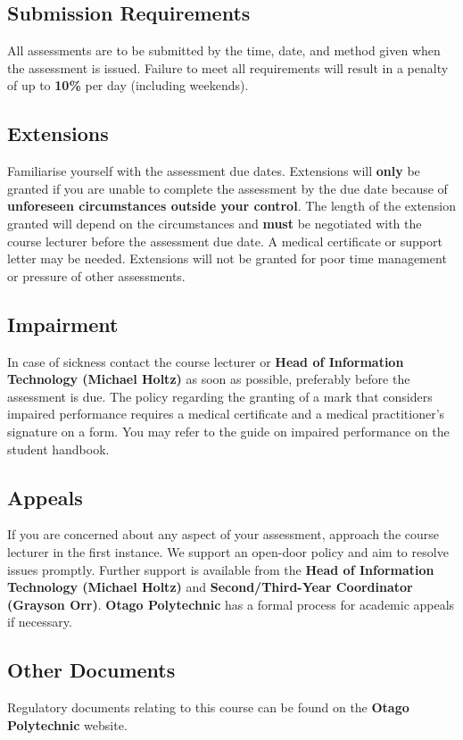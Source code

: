 \documentclass{article}
\begin{document}
\subsection*{Submission Requirements}
All assessments are to be submitted by the time, date, and method given when the assessment is issued. Failure to meet all requirements will result in a penalty of up to \textbf{10\%} per day (including weekends).

\subsection*{Extensions}
Familiarise yourself with the assessment due dates. Extensions will \textbf{only} be granted if you are unable to complete the assessment by the due date because of \textbf{unforeseen circumstances outside your control}. The length of the extension granted will depend on the circumstances and \textbf{must} be negotiated with the course lecturer before the assessment due date. A medical certificate or support letter may be needed. Extensions will not be granted for poor time management or pressure of other assessments.

\subsection*{Impairment}
In case of sickness contact the course lecturer or \textbf{Head of Information Technology (Michael Holtz)} as soon as possible, preferably before the assessment is due. The policy regarding the granting of a mark that considers impaired performance requires a medical certificate and a medical practitioner’s signature on a form. You may refer to the guide on impaired performance on the student handbook.

\subsection*{Appeals}
If you are concerned about any aspect of your assessment, approach the course lecturer in the first instance. We support an open-door policy and aim to resolve issues promptly. Further support is available from the \textbf{Head of Information Technology (Michael Holtz)} and \textbf{Second/Third-Year Coordinator (Grayson Orr)}. \textbf{Otago Polytechnic} has a formal process for academic appeals if necessary.

\subsection*{Other Documents}
Regulatory documents relating to this course can be found on the \textbf{Otago Polytechnic} website.
\end{document}
